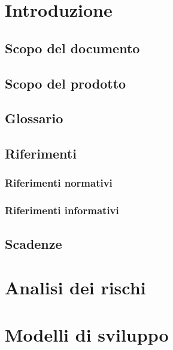 \documentclass[a4paper, oneside, openany, dvipsnames, table]{article}
\begin{document}
\copertina{}


\newpage
\tableofcontents
\newpage
\listoffigures
\newpage
\listoftables
\newpage

\section{Introduzione}
	\subsection{Scopo del documento}
		
	\subsection{Scopo del prodotto}
		
	\subsection{Glossario}
		
	\subsection{Riferimenti}
		\subsubsection{Riferimenti normativi}
			
		\subsubsection{Riferimenti informativi}
		\label{sec:RifInf}
			
	\subsection{Scadenze}
		
\newpage
\section{Analisi dei rischi}
	\label{sec:rischi}
	
	\newpage
	
\newpage
\section{Modelli di sviluppo}
	
\end{document}
